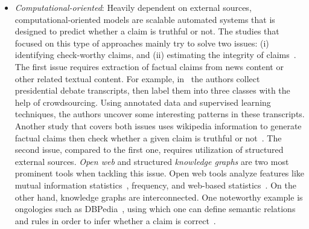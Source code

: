 \begin{description}
\begin{itemize}
              is a collection of annotations which are afterwards aggregated to obtain an overall result indicating the veracity of news. Unlike professional fact-checkers, who are in short supply, this approach is scalable given that the crowd contains enough literate people~\parencite{ScalingUpFactChecking_Allen}.  For instance, Twitter launched a program called
              Birdwatch\footnote{https://twitter.github.io/birdwatch/overview/}, in which the users are able to leave notes for tweets that they
              think contains misinformation. Furthermore, this tool allows users to rate each other’s notes, leading to the diversity of perspectives\footnote{https://twitter.github.io/birdwatch/diversity-of-perspectives/}. Another example is from
              Facebook\footnote{https://www.facebook.com/formedia/blog/third-party-fact-checking-how-it-works}, which uses a third party of
              crowdsourced fact-checkers called International Fact-Checking Network\footnote{https://www.poynter.org/ifcn/} (IFCN).
        \item \emph{Computational-oriented}: Heavily dependent on external sources, computational-oriented models are scalable automated
              systems that is designed to predict whether a claim is truthful or not. The studies that focused on this type of approaches mainly try
              to solve two issues: (i) identifying check-worthy claims, and (ii) estimating the integrity of
              claims~\parencite{FakeNewsDetectionOnSocialMediaADataMiningPerspective_Shu}.  The first issue requires extraction of factual claims from news content or other related textual content. For example, in~\parencite{DetectingCheckWorthyClaims_Hassan} the authors collect presidential debate transcripts, then label them into three classes with the help of crowdsourcing. Using annotated data and supervised learning techniques, the authors uncover some interesting patterns in these transcripts. Another study that covers both issues uses wikipedia information to generate factual claims then check whether a given claim is truthful or not~\parencite{FEVER_Thorne}.  The second issue, compared to the first one, requires utilization of structured external sources. \emph{Open web} and structured \emph{knowledge graphs} are two most prominent tools when tackling this issue. Open web tools analyze features like mutual information statistics~\parencite{UnsupervisedNamedEntityExtraction_Etzioni}, frequency, and web-based statistics~\parencite{WebBasedStatisticalFactChecking_Magdy}.  On the other hand, knowledge graphs are interconnected. One noteworthy example is ongologies such as DBPedia~\parencite{DBPedia_Auer}, using which one can define semantic relations and rules in order to infer whether a claim is correct~\parencite{SemanticFakeNewsDetection_Bracsoveanu}.
    \end{itemize}
\end{description}


